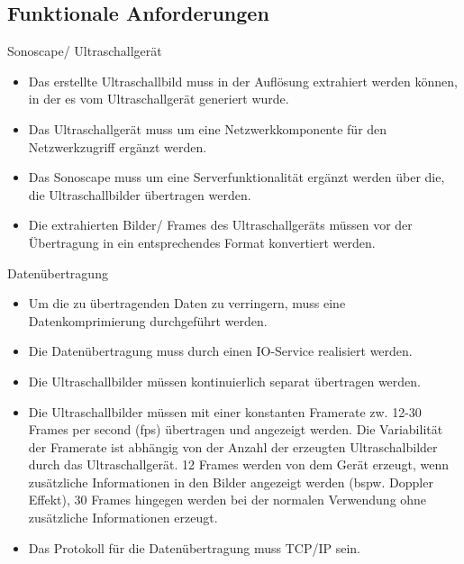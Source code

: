 \subsection{Funktionale Anforderungen} \label{FunkAnf}
\begin{minipage}{\textwidth}
Sonoscape/ Ultraschallgerät
\begin{itemize}
\item Das erstellte Ultraschallbild muss in der Auflösung extrahiert werden können, in der es vom Ultraschallgerät generiert wurde.
\item Das Ultraschallgerät muss um eine Netzwerkkomponente für den Netzwerkzugriff ergänzt werden.
\item Das Sonoscape muss um eine Serverfunktionalität ergänzt werden über die, die Ultraschallbilder übertragen werden.
\item Die extrahierten Bilder/ Frames des Ultraschallgeräts müssen vor der Übertragung in ein entsprechendes Format konvertiert werden.
\end{itemize}
\end{minipage}

\begin{minipage}{\textwidth}
Datenübertragung
\begin{itemize}
\item Um die zu übertragenden Daten zu verringern, muss eine Datenkomprimierung durchgeführt werden. 
\item Die Datenübertragung muss durch einen IO-Service realisiert werden.
\item Die Ultraschallbilder müssen kontinuierlich separat übertragen werden.
\item Die Ultraschallbilder müssen mit einer konstanten Framerate zw. 12-30 Frames per second (fps) übertragen und angezeigt werden. Die Variabilität der Framerate ist abhängig von der Anzahl der erzeugten Ultraschalbilder durch das Ultraschallgerät. 12 Frames werden von dem Gerät erzeugt, wenn zusätzliche Informationen in den Bilder angezeigt werden (bspw. Doppler Effekt), 30 Frames hingegen werden bei der normalen Verwendung ohne zusätzliche Informationen erzeugt.
\item Das Protokoll für die Datenübertragung muss TCP/IP sein.
\end{itemize}
\end{minipage}

